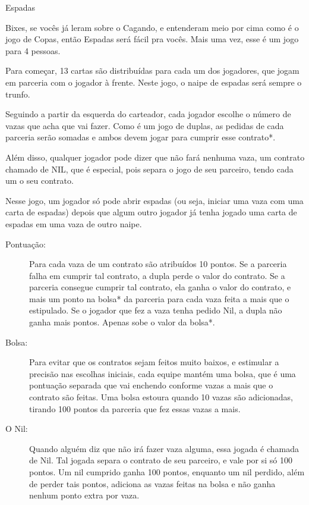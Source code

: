 \begin{subsecao}{Espadas} 

Bixes, se vocês já leram sobre o Cagando, e entenderam meio por cima como é o
jogo de Copas, então Espadas será fácil pra vocês. Mais uma vez, esse é um jogo
para 4 pessoas.

Para começar, 13 cartas são distribuídas para cada um dos jogadores, que jogam
em parceria com o jogador à frente. Neste jogo, o naipe de espadas será sempre o
trunfo.

Seguindo a partir da esquerda do carteador, cada jogador escolhe o número de
vazas que acha que vai fazer. Como é um jogo de duplas, as pedidas de cada
parceria serão somadas e ambos devem jogar para cumprir esse contrato*. 

Além disso, qualquer jogador pode dizer que não fará nenhuma vaza, um contrato
chamado de NIL, que é especial, pois separa o jogo de seu parceiro, tendo cada
um o seu contrato.

Nesse jogo, um jogador só pode abrir espadas (ou seja, iniciar uma vaza com uma
carta de espadas) depois que algum outro jogador já tenha jogado uma carta de espadas
em uma vaza de outro naipe.
\begin{description}

\item[Pontuação:]

Para cada vaza de um contrato são atribuídos 10 pontos. Se a parceria falha em
cumprir tal contrato, a dupla perde o valor do contrato. Se a parceria consegue
cumprir tal contrato, ela ganha o valor do contrato, e mais um ponto
na bolsa* da parceria para cada vaza feita a mais que o estipulado.
Se o jogador que fez a vaza tenha pedido Nil, a dupla não ganha mais pontos.
Apenas sobe o valor da bolsa*.

\item[Bolsa:]

Para evitar que os contratos sejam feitos muito baixos, e estimular a precisão
nas escolhas iniciais, cada equipe mantém uma bolsa, que é uma pontuação
separada que vai enchendo conforme vazas a mais que o contrato são feitas. Uma
bolsa estoura quando 10 vazas são adicionadas, tirando 100 pontos da parceria
que fez essas vazas a mais.

\item[O Nil:]
Quando alguém diz que não irá fazer vaza alguma, essa jogada é chamada de Nil.
Tal jogada separa o contrato de seu parceiro, e vale por si só 100 pontos. Um
nil cumprido ganha 100 pontos, enquanto um nil perdido, além de perder tais
pontos, adiciona as vazas feitas na bolsa e não ganha nenhum ponto extra por
vaza.


\end{description}
\end{subsecao}
